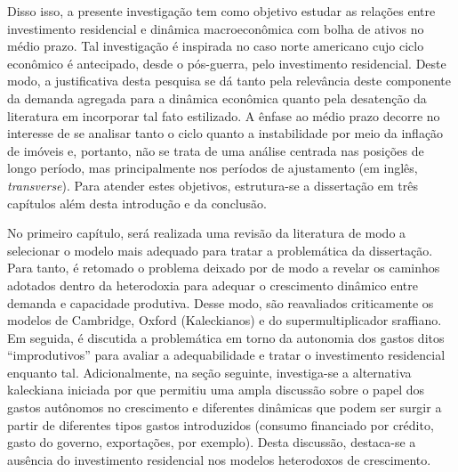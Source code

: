 Disso isso, a presente investigação tem como objetivo estudar as relações entre investimento residencial e dinâmica macroeconômica com bolha de ativos no médio prazo. 
Tal investigação é inspirada no caso norte americano cujo ciclo econômico é antecipado, desde o pós-guerra, pelo investimento residencial. Deste modo, a justificativa desta pesquisa se dá tanto pela relevância deste componente da demanda agregada para a dinâmica econômica quanto pela desatenção da literatura em incorporar tal fato estilizado. 
A ênfase ao médio prazo decorre no interesse de se analisar tanto o ciclo quanto a instabilidade por meio da inflação de imóveis e, portanto, não se trata de uma análise centrada nas posições de longo período, mas principalmente nos períodos de ajustamento (em inglês, \textit{transverse}).
Para atender estes objetivos, estrutura-se a dissertação em três capítulos além desta introdução e da conclusão.

No primeiro capítulo, será realizada uma revisão da literatura de modo a selecionar o modelo mais adequado para tratar a problemática da dissertação. Para tanto, é retomado o problema deixado por \textcite{harrod_essay_1939} de modo a revelar os caminhos adotados dentro da heterodoxia para adequar o crescimento dinâmico entre demanda e capacidade produtiva. Desse modo, são reavaliados criticamente os modelos de Cambridge, Oxford (Kaleckianos) e do supermultiplicador sraffiano. 
Em seguida, é discutida a problemática em torno da autonomia dos gastos ditos ``improdutivos'' para avaliar a adequabilidade e tratar o investimento residencial enquanto tal.
Adicionalmente, na seção seguinte, investiga-se a alternativa kaleckiana iniciada por \textcite{allain_tackling_2015} que permitiu uma ampla discussão sobre o papel dos gastos autônomos no crescimento e diferentes dinâmicas que podem ser surgir a partir de diferentes tipos gastos  introduzidos (consumo financiado por crédito, gasto do governo, exportações, por exemplo).
Desta discussão, destaca-se a ausência do investimento residencial nos modelos heterodoxos de crescimento. %




